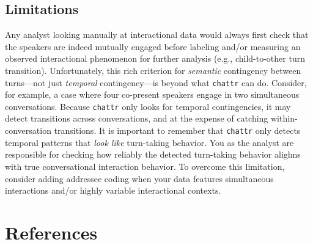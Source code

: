 \documentclass[10pt, letterpaper]{article}
\begin{document}
\hypertarget{limitations}{%
\subsection{Limitations}\label{limitations}}

Any analyst looking manually at interactional data would always first
check that the speakers are indeed mutually engaged before labeling
and/or measuring an observed interactional phenomenon for further
analysis (e.g., child-to-other turn transition). Unfortunately, this
rich criterion for \emph{semantic} contingency between turns---not just
\emph{temporal} contingency---is beyond what \texttt{chattr} can do.
Consider, for example, a case where four co-present speakers engage in
two simultaneous conversations. Because \texttt{chattr} only looks for
temporal contingencies, it may detect transitions across conversations,
and at the expense of catching within-conversation transitions. It is
important to remember that \texttt{chattr} only detects temporal
patterns that \emph{look like} turn-taking behavior. You as the analyst
are responsible for checking how reliably the detected turn-taking
behavior alighns with true conversational interaction behavior. To
overcome this limitation, consider adding addressee coding when your
data features simultaneous interactions and/or highly variable
interactional contexts.

\hypertarget{references}{%
\section{References}\label{references}}

\setlength{\parindent}{-0.1in} 
\setlength{\leftskip}{0.125in}

\noindent


\end{document}
